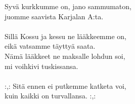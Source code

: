 
Syvä kurkkumme on, jano sammumaton, \\ juomme saavista Karjalan A:ta. \\ \hspace{10mm} \\ Sillä Kossu ja kessu ne lääkkeemme on, \\ eikä vatsamme täyttyä saata. \\ Nämä lääkkeet ne maksalle lohdun soi, \\ mi voihkivi tuskissansa. \\ \hspace{10mm} \\ :,: Sitä ennen ei putkemme katketa voi, \\ kuin kaikki on turvallansa. :,: